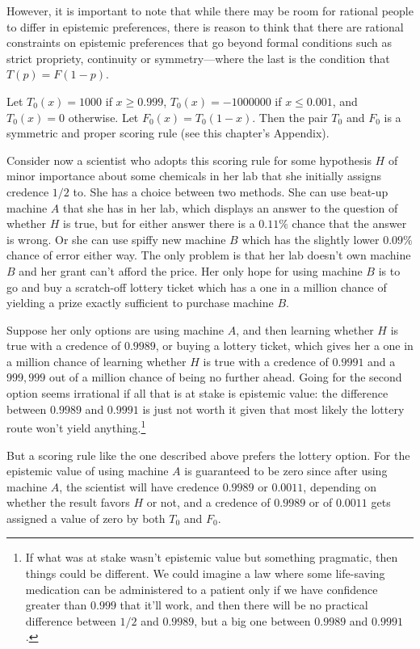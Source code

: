 However, it is important to note that while there may be room for rational people to differ in epistemic preferences, there is reason to
think that there are rational constraints on epistemic preferences that go beyond formal conditions such as strict propriety, continuity
or symmetry---where the last is the condition that $T(p)=F(1-p)$. 

Let $T_0(x)=1000$ if $x\ge 0.999$, $T_0(x)=-1000000$ if $x \le 0.001$, and $T_0(x)=0$ otherwise. Let $F_0(x)=T_0(1-x)$.
Then the pair $T_0$ and $F_0$ is a symmetric and proper scoring rule (see this chapter's Appendix).

Consider now a scientist who adopts this scoring rule for some hypothesis $H$ of minor importance about some chemicals in 
her lab that she initially assigns credence $1/2$ to. She has a choice between two methods. She can use beat-up machine $A$
that she has in her lab, which displays an answer to the question of whether $H$ is true, but for either
answer there is a $0.11\%$ chance that the answer is wrong. Or she can use spiffy new machine $B$ which has the slightly lower $0.09\%$ chance 
of error either way. The only problem is that her lab doesn't own machine $B$ and her grant can't afford the price. Her only 
hope for using machine $B$ is to go and buy a scratch-off lottery ticket which has a one in a million chance of yielding a prize exactly
sufficient to purchase machine $B$.

Suppose her only options are using machine $A$, and then learning whether $H$ is true with a credence of
$0.9989$, or buying a lottery ticket, which gives her a one in a million chance of learning whether $H$ is true with
a credence of $0.9991$ and a $999,999$ out of a million chance of being no further ahead. Going for the second option
seems irrational if all that is at stake is epistemic value: the difference between $0.9989$ and $0.9991$ is just not
worth it given that most likely the lottery route won't yield anything.\footnote{If what was at stake
wasn't epistemic value but something pragmatic, then things could be different. We could imagine a law where some 
life-saving medication can be administered to a patient only if we have confidence greater than $0.999$ that it'll work, and then
there will be no practical difference between $1/2$ and $0.9989$, but a big one between $0.9989$ and $0.9991$.}

But a scoring rule like the one described above prefers the lottery option. For the epistemic value of using 
machine $A$ is guaranteed to be zero since after using machine $A$, the scientist will have credence $0.9989$ or $0.0011$, 
depending on whether the result favors $H$ or not, and a credence of $0.9989$ or of $0.0011$ gets assigned a value
of zero by both $T_0$ and $F_0$.

